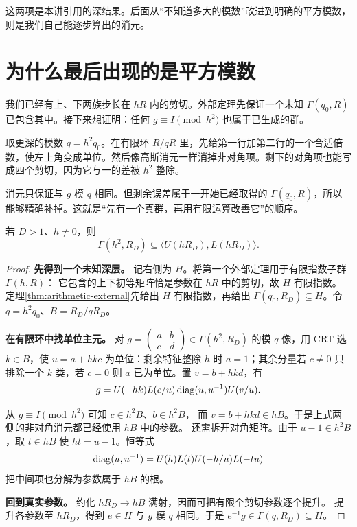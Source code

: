 这两项是本讲引用的深结果。后面从“不知道多大的模数”改进到明确的平方模数，则是我们自己能逐步算出的消元。

\section{为什么最后出现的是平方模数}
我们已经有上、下两族步长在 $hR$ 内的剪切。外部定理先保证一个未知 $\Gamma(q_0,R)$ 已包含其中。接下来想证明：任何 $g\equiv I\pmod{h^2}$ 也属于已生成的群。

取更深的模数 $q=h^2q_0$。在有限环 $R/qR$ 里，先给第一行加第二行的一个合适倍数，使左上角变成单位。然后像高斯消元一样消掉非对角项。剩下的对角项也能写成四个剪切，因为它与一的差被 $h^2$ 整除。

消元只保证与 $g$ 模 $q$ 相同。但剩余误差属于一开始已经取得的 $\Gamma(q_0,R)$，所以能够精确补掉。这就是“先有一个真群，再用有限运算改善它”的顺序。
\begin{lemma}[两条根生成一个确定的同余层]\label{lem:deep}
若 $D>1$、$h\ne0$，则
\[
\Gamma(h^2,R_D)\subseteq\langle U(hR_D),L(hR_D)\rangle.
\]
\end{lemma}
\begin{proof}

\par\noindent\textbf{先得到一个未知深层。}
记右侧为 $H$。将第一个外部定理用于有限指数子群 $\Gamma(h,R)$：
它包含的上下初等矩阵恰是参数在 $hR$ 中的剪切，故 $H$ 有限指数。
定理\ref{thm:arithmetic-external}先给出 $H$ 有限指数，再给出 $\Gamma(q_0,R_D)\subseteq H$。令 $q=h^2q_0$、$B=R_D/qR_D$。

\par\noindent\textbf{在有限环中找单位主元。}
对 $g=\left(\begin{smallmatrix}a&b\\c&d\end{smallmatrix}\right)\in\Gamma(h^2,R_D)$ 的模 $q$ 像，用 CRT 选 $k\in B$，使 $u=a+hkc$ 为单位：剩余特征整除 $h$ 时 $a=1$；其余分量若 $c\ne0$ 只排除一个 $k$ 类，若 $c=0$ 则 $a$ 已为单位。置 $v=b+hkd$，有
\[
g=U(-hk)L(c/u)\operatorname{diag}(u,u^{-1})U(v/u).
\]

从 $g\equiv I\pmod{h^2}$ 可知 $c\in h^2B$、$b\in h^2B$，
而 $v=b+hkd\in hB$。于是上式两侧的非对角消元都已经使用 $hB$ 中的参数。
还需拆开对角矩阵。由于 $u-1\in h^2B$，取 $t\in hB$ 使 $ht=u-1$。恒等式
\[
\operatorname{diag}(u,u^{-1})=U(h)L(t)U(-h/u)L(-tu)
\]
把中间项也分解为参数属于 $hB$ 的根。
\par\noindent\textbf{回到真实参数。}
约化 $hR_D\to hB$ 满射，因而可把有限个剪切参数逐个提升。
提升各参数至 $hR_D$，得到 $e\in H$ 与 $g$ 模 $q$ 相同。于是 $e^{-1}g\in\Gamma(q,R_D)\subseteq H$。
\end{proof}

